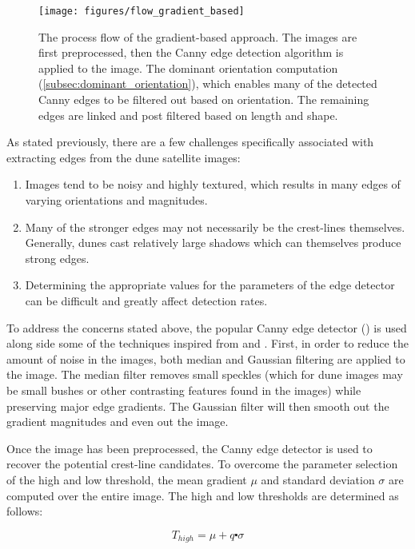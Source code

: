  \begin{figure}[H]
 	\centering
 	\texttt{[image: figures/flow\_gradient\_based]}
 	\caption{The process flow of the gradient-based approach. The images are first preprocessed, then the Canny edge detection algorithm is applied to the image. The dominant orientation computation (\ref{subsec:dominant_orientation}), which enables many of the detected Canny edges to be filtered out based on orientation. The remaining edges are linked and post filtered based on length and shape.}
 	\label{fig:flow_gradient_based}
 \end{figure}

As stated previously, there are a few challenges specifically associated with extracting edges from the dune satellite images:

\begin{enumerate}
	\item Images tend to be noisy and highly textured, which results in many edges of varying orientations and magnitudes.
	\item Many of the stronger edges may not necessarily be the crest-lines themselves. Generally, dunes cast relatively large shadows which can themselves produce strong edges.
	\item Determining the appropriate values for the parameters of the edge detector can be difficult and greatly affect detection rates.
\end{enumerate}

To address the concerns stated above, the popular Canny edge detector (\cite{1986_canny_edge_detection}) is used along side some of the techniques inspired from \cite{Improved_Canny_Edge_Detection} and \cite{Runway_detection_tracking_unmanned}. First, in order to reduce the amount of noise in the images, both median and Gaussian filtering are applied to the image. The median filter removes small speckles (which for dune images may be small bushes or other contrasting features found in the images) while preserving major edge gradients. The Gaussian filter will then smooth out the gradient magnitudes and even out the image.

Once the image has been preprocessed, the Canny edge detector is used to recover the potential crest-line candidates. To overcome the parameter selection of the high and low threshold, the mean gradient $\mu$ and standard deviation $\sigma$ are computed over the entire image. The high and low thresholds are determined as follows:

\begin{equation}
T_{high}=\mu+q\centerdot\sigma
\end{equation}

